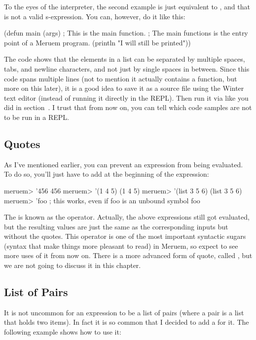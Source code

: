 To the eyes of the interpreter, the second example is just equivalent to , and that is not a valid s-expression. You can, however, do it like this:

\begin{Meruem}
(defun main (args)    ; This is the main function.
  ; The main functions is the entry point of a Meruem program.
  (println "I will still be printed"))
\end{Meruem}

The code shows that the elements in a list can be separated by multiple spaces, tabs, and newline characters, and not just by single spaces in between. Since this code spans multiple lines (not to mention it actually contains a  function, but more on this later), it is a good idea to save it as a source file using the Winter text editor (instead of running it directly in the REPL). Then run it via  like you did in section~. I trust that from now on, you can tell which code samples are not to be run in a REPL. 

\subsection{Quotes}
\label{sec:quotes}
As I've mentioned earlier, you can prevent an expression from being evaluated. To do so, you'll just have to add  at the beginning of the expression:

\begin{REPL}
meruem> '456
456
meruem> '(1 4 5)
(1 4 5)
meruem> '(list 3 5 6)
(list 3 5 6)
meruem> 'foo  ; this works, even if foo is an unbound symbol
foo
\end{REPL}

The  is known as the  operator. Actually, the above expressions still got evaluated, but the resulting values are just the same as the corresponding inputs but without the quotes. This operator is one of the most important syntactic sugars (syntax that make things more pleasant to read) in Meruem, so expect to see more uses of it from now on. There is a more advanced form of quote, called , but we are not going to discuss it in this chapter.

\subsection{List of Pairs}
\label{sec:list-of-pairs}
It is not uncommon for an expression to be a list of pairs (where a pair is a list that holds two items). In fact it is so common that I decided to add a  for it. The following example shows how to use it:

